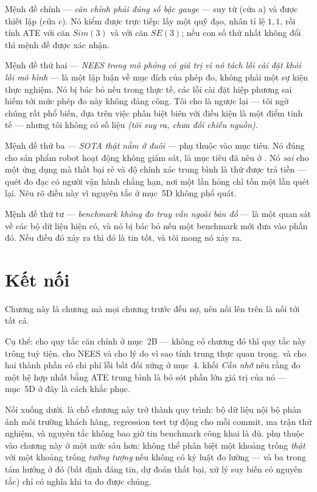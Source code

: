 \documentclass[../../vslam.tex]{subfiles}
\begin{document}
Mệnh đề chính --- \emph{căn chỉnh phải đúng số bậc gauge} --- suy từ  (cửa a) và được \cite{zhang2018trajeval} thiết lập (cửa c). Nó kiểm được trực tiếp: lấy một quỹ đạo, nhân tỉ lệ \(1{,}1\), rồi tính ATE với căn \(Sim(3)\) và với căn \(SE(3)\); nếu con số thứ nhất không đổi thì mệnh đề được xác nhận.

Mệnh đề thứ hai --- \emph{NEES trong mô phỏng có giá trị vì nó tách lỗi cài đặt khỏi lỗi mô hình} --- là một lập luận về mục đích của phép đo, không phải một sự kiện thực nghiệm. Nó bị bác bỏ nếu trong thực tế, các lỗi cài đặt hiệp phương sai hiếm tới mức phép đo này không đáng công. Tôi cho là ngược lại --- tôi ngờ chúng rất phổ biến, dựa trên việc phân biệt biên với điều kiện là một điểm tinh tế --- nhưng tôi không có số liệu \emph{(tôi suy ra, chưa đối chiếu nguồn)}.

Mệnh đề thứ ba --- \emph{SOTA thật nằm ở đuôi} --- phụ thuộc vào mục tiêu. Nó đúng cho sản phẩm robot hoạt động không giám sát, là mục tiêu đã nêu ở . Nó \emph{sai} cho một ứng dụng mà thất bại rẻ và độ chính xác trung bình là thứ được trả tiền --- quét đo đạc có người vận hành chẳng hạn, nơi một lần hỏng chỉ tốn một lần quét lại. Nêu rõ điều này vì nguyên tắc ở mục~5D không phổ quát.

Mệnh đề thứ tư --- \emph{benchmark không đo truy vấn ngoài bản đồ} --- là một quan sát về các bộ dữ liệu hiện có, và nó bị bác bỏ nếu một benchmark mới đưa vào phần đó. Nếu điều đó xảy ra thì đó là tin tốt, và tôi mong nó xảy ra.

\section{Kết nối}

Chương này là chương mà mọi chương trước đều nợ, nên nối lên trên là nối tới tất cả.

Cụ thể:  cho quy tắc căn chỉnh ở mục~2B --- không có chương đó thì quy tắc này trông tuỳ tiện.  cho NEES và cho lý do vì sao tính trung thực quan trọng.  và  cho hai thành phần có chi phí lỗi bất đối xứng ở mục~4.  khối \emph{Cần nhớ} nêu rằng đo một hệ hợp nhất bằng ATE trung bình là bỏ sót phần lớn giá trị của nó --- mục~5D ở đây là cách khắc phục.

Nối xuống dưới.  là chỗ chương này trở thành quy trình: bộ dữ liệu nội bộ phản ánh môi trường khách hàng, regression test tự động cho mỗi commit, ma trận thử nghiệm, và nguyên tắc không bao giờ tin benchmark công khai là đủ.  phụ thuộc vào chương này ở một mức sâu hơn: không thể phân biệt một khoảng trống \emph{thật} với một khoảng trống \emph{tưởng tượng} nếu không có kỷ luật đo lường --- và ba trong tám hướng ở đó (bất định đáng tin, dự đoán thất bại, xử lý suy biến có nguyên tắc) chỉ có nghĩa khi ta đo được chúng.
\end{document}
